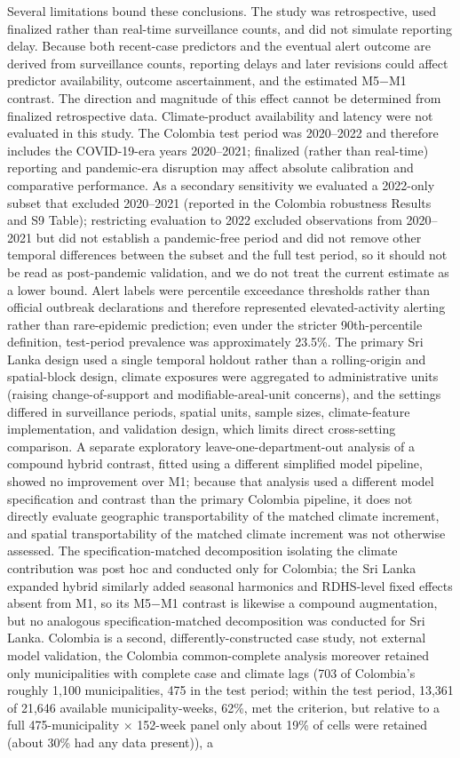\documentclass[11pt,a4paper]{article}
\begin{document}
Several limitations bound these conclusions. The study was retrospective, used finalized rather than real-time surveillance counts, and did not simulate reporting delay. Because both recent-case predictors and the eventual alert outcome are derived from surveillance counts, reporting delays and later revisions could affect predictor availability, outcome ascertainment, and the estimated M5$-$M1 contrast. The direction and magnitude of this effect cannot be determined from finalized retrospective data. Climate-product availability and latency were not evaluated in this study. The Colombia test period was 2020--2022 and therefore includes the COVID-19-era years 2020--2021; finalized (rather than real-time) reporting and pandemic-era disruption may affect absolute calibration and comparative performance. As a secondary sensitivity we evaluated a 2022-only subset that excluded 2020--2021 (reported in the Colombia robustness Results and S9 Table); restricting evaluation to 2022 excluded observations from 2020--2021 but did not establish a pandemic-free period and did not remove other temporal differences between the subset and the full test period, so it should not be read as post-pandemic validation, and we do not treat the current estimate as a lower bound. Alert labels were percentile exceedance thresholds rather than official outbreak declarations and therefore represented elevated-activity alerting rather than rare-epidemic prediction; even under the stricter 90th-percentile definition, test-period prevalence was approximately 23.5\%. The primary Sri Lanka design used a single temporal holdout rather than a rolling-origin and spatial-block design, climate exposures were aggregated to administrative units (raising change-of-support and modifiable-areal-unit concerns), and the settings differed in surveillance periods, spatial units, sample sizes, climate-feature implementation, and validation design, which limits direct cross-setting comparison. A separate exploratory leave-one-department-out analysis of a compound hybrid contrast, fitted using a different simplified model pipeline, showed no improvement over M1; because that analysis used a different model specification and contrast than the primary Colombia pipeline, it does not directly evaluate geographic transportability of the matched climate increment, and spatial transportability of the matched climate increment was not otherwise assessed. The specification-matched decomposition isolating the climate contribution was post hoc and conducted only for Colombia; the Sri Lanka expanded hybrid similarly added seasonal harmonics and RDHS-level fixed effects absent from M1, so its M5$-$M1 contrast is likewise a compound augmentation, but no analogous specification-matched decomposition was conducted for Sri Lanka. Colombia is a second, differently-constructed case study, not external model validation, the Colombia common-complete analysis moreover retained only municipalities with complete case and climate lags (703 of Colombia's roughly 1,100 municipalities, 475 in the test period; within the test period, 13,361 of 21,646 available municipality-weeks, 62\%, met the criterion, but relative to a full 475-municipality $\times$ 152-week panel only about 19\% of cells were retained (about 30\% had any data present)), a 
\end{document}
